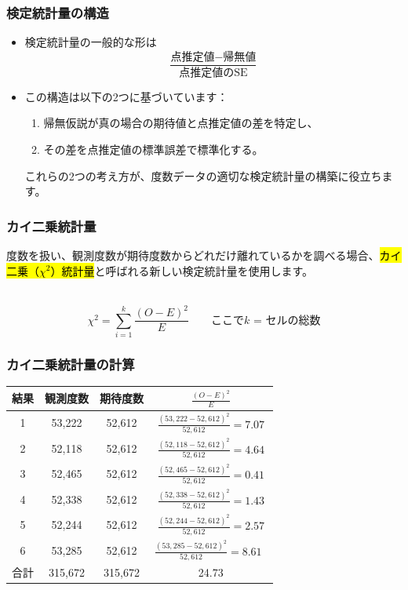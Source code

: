 \begin{frame}
\frametitle{検定統計量の構造}

\begin{itemize}

\item 検定統計量の一般的な形は
\[ \frac{\text{点推定値} - \text{帰無値}}{\text{点推定値のSE}} \]

\item この構造は以下の2つに基づいています：
\begin{enumerate}
\item 帰無仮説が真の場合の期待値と点推定値の差を特定し、
\item その差を点推定値の標準誤差で標準化する。
\end{enumerate}

これらの2つの考え方が、度数データの適切な検定統計量の構築に役立ちます。

\end{itemize}

\end{frame}


\begin{frame}
\frametitle{カイ二乗統計量}

度数を扱い、観測度数が期待度数からどれだけ離れているかを調べる場合、\hl{カイ二乗（$\chi^2$）統計量}と呼ばれる新しい検定統計量を使用します。

$\:$ \\

{
\[\chi^2 = \sum_{i = 1}^k \frac{(O - E)^2}{E} \qquad \text{ここで$k$ = セルの総数} \]
}

\end{frame}


\begin{frame}
\frametitle{カイ二乗統計量の計算}

\begin{center}
\renewcommand\arraystretch{1.8}
\begin{tabular}{c | c c | c}
結果	& 観測度数	& 期待度数 	& $\frac{(O - E)^2}{E}$\\
\hline
1		& 53,222		& 52,612 		& $\frac{(53,222 - 52,612)^2}{52,612} = 7.07$ \\
2		& 52,118		& 52,612 		& $\frac{(52,118 - 52,612)^2}{52,612} = 4.64$ \\
3		& 52,465		& 52,612 		& $\frac{(52,465 - 52,612)^2}{52,612} = 0.41$ \\
4		& 52,338		& 52,612 		& $\frac{(52,338 - 52,612)^2}{52,612} = 1.43$\\
5		& 52,244		& 52,612 		& $\frac{(52,244 - 52,612)^2}{52,612} = 2.57$\\
6		& 53,285		& 52,612 		& $\frac{(53,285 - 52,612)^2}{52,612} = 8.61$\ \\
\hline
合計		& 315,672		& 315,672		& 24.73
\end{tabular}
\end{center}

\end{frame}

